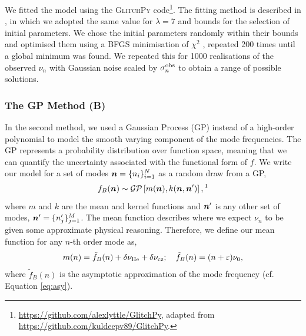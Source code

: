 We fitted the model using the \textsc{GlitchPy} code\footnote{\url{https://github.com/alexlyttle/GlitchPy}, adapted from \url{https://github.com/kuldeepv89/GlitchPy}.}. The fitting method is described in \citet{Verma.Raodeo.ea2019}, in which we adopted the same value for \(\lambda=7\) and bounds for the selection of initial parameters. We chose the initial parameters randomly within their bounds and optimised them using a BFGS minimisation of \(\chi^2\) \citep{Fletcher1987}, repeated 200 times until a global minimum was found. We repeated this for 1000 realisations of the observed \(\nu_n\) with Gaussian noise scaled by \(\sigma_n^{{\mathrm{obs}}}\) to obtain a range of possible solutions.

\subsubsection{The GP Method (B)}

In the second method, we used a Gaussian Process (GP) instead of a high-order polynomial to model the smooth varying component of the mode frequencies. The GP represents a probability distribution over function space, meaning that we can quantify the uncertainty associated with the functional form of $f$. We write our model for a set of modes \(\bm{n} = \{n_i\}_{i=1}^N\) as a random draw from a GP,
%
\begin{equation}
    f_{B}(\vect{n}) \sim \mathcal{GP}\left[ m(\vect{n}), k(\vect{n}, \vect{n}') \right],\text{\footnotemark}
\end{equation}
%
%
where \(m\) and \(k\) are the mean and kernel functions and \(\bm{n}'\) is any other set of modes, \(\bm{n}' = \{n'_j\}_{j=1}^M\). The mean function describes where we expect \(\nu_n\) to be given some approximate physical reasoning. Therefore, we define our mean function for any \(n\)-th order mode as,
%
\begin{equation}
    m(n) = \tilde{f}_B(n) + \delta\nu_{{\mathrm{He}}} + \delta\nu_{{\mathrm{cz}}}; \quad \tilde{f}_B(n) = (n + \varepsilon) \nu_0, \label{eq:asy-glitch}
\end{equation}
%
where \(\tilde{f}_B(n)\) is the asymptotic approximation of the mode frequency (cf. Equation \ref{eq:asy}).


